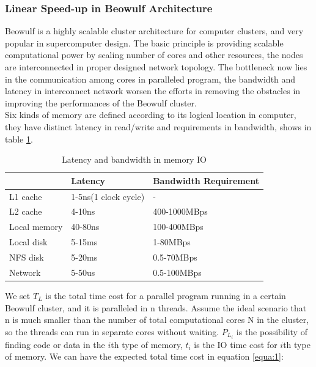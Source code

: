 \documentclass[11pt,openright,a4paper]{report}
\begin{document}
\subsubsection{Linear Speed-up in Beowulf Architecture}
Beowulf is a highly scalable cluster architecture for computer clusters, and very popular in supercomputer design\cite{behrooz2005computer}. The basic principle is providing scalable computational power by scaling number of cores and other resources, the nodes are interconnected in proper designed network topology. The bottleneck now lies in the communication among cores in paralleled program\cite{brown2004engineering}, the bandwidth and latency in interconnect network worsen the efforts in removing the obstacles in improving the performances of the Beowulf cluster.\\
Six kinds of memory are defined according to its logical location in computer, they have distinct latency in read/write and requirements in bandwidth, shows in table \ref{table:1}.\\
\begin{table}[htb]
\begin{center}
	\caption{Latency and bandwidth in memory IO}
	\label{table:1}
	\begin{tabular}{lll}
		\hline
		& Latency              & Bandwidth Requirement \\ \hline
		L1 cache     & 1-5ns(1 clock cycle) & -                     \\
		L2 cache     & 4-10ns               & 400-1000MBps          \\
		Local memory & 40-80ns              & 100-400MBps           \\
		Local disk   & 5-15ms               & 1-80MBps              \\
		NFS disk     & 5-20ms               & 0.5-70MBps            \\
		Network      & 5-50us               & 0.5-100MBps           \\ \hline
	\end{tabular}
\end{center}
\end{table}
We set  $T_{L}$ is the total time cost for a parallel program running in a certain Beowulf cluster, and it is paralleled in n threads. Assume the ideal scenario that n is much smaller than the number of total computational cores N in the cluster, so the threads can run in separate cores without waiting. $P_{L_{i}}$ is the possibility of finding code or data in the ${i}$th type of memory, $t_{i}$ is the IO time cost for ${i}$th type of memory. We can have the expected total time cost in equation \ref{equa:1}:\\
\end{document}
